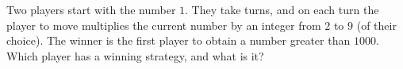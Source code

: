 Two players start with the number $1$. They take turns, and on each turn the player to move multiplies the current number by an integer from $2$ to $9$ (of their choice). The winner is the first player to obtain a number greater than $1000$. Which player has a winning strategy, and what is it?
